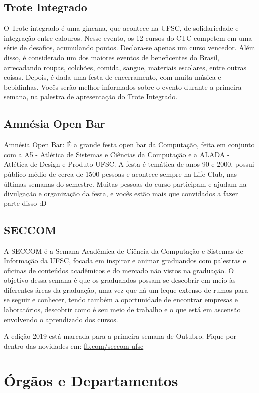 \documentclass{article}
\begin{document}
\subsection{Trote Integrado}
O Trote integrado é uma gincana, que acontece na UFSC, de solidariedade e integração entre calouros. Nesse evento, os 12 cursos do CTC competem em uma série de desafios, acumulando pontos. Declara-se apenas um curso vencedor. Além disso, é considerado um dos maiores eventos de beneficentes do Brasil, arrecadando roupas, colchões, comida, sangue, materiais escolares, entre outras coisas. Depois, é dada uma festa de encerramento, com muita música e bebidinhas. Vocês serão melhor informados sobre o evento durante a primeira semana, na palestra de apresentação do Trote Integrado. 

\subsection{Amnésia Open Bar} 
Amnésia Open Bar: É a grande festa open bar da Computação, feita em conjunto com a A5 - Atlética de Sistemas e Ciências da Computação e a ALADA - Atlética de Design e Produto UFSC. A festa é temática de anos 90 e 2000, possui público médio de cerca de 1500 pessoas e acontece sempre na Life Club, nas últimas semanas do semestre. Muitas pessoas do curso participam e ajudam na divulgação e organização da festa, e vocês estão mais que convidados a fazer parte disso :D

\subsection{SECCOM} 
A SECCOM é a Semana Acadêmica de Ciência da Computação e Sistemas de Informação da UFSC, focada em inspirar e animar graduandos com palestras e oficinas de conteúdos acadêmicos e do mercado não vistos na graduação. O objetivo dessa semana é que os graduandos possam se descobrir em meio às diferentes áreas da graduação, uma vez que há um leque extenso de rumos para se seguir e conhecer, tendo também a oportunidade de encontrar empresas e laboratórios, descobrir como é seu meio de trabalho e o que está em ascensão envolvendo o aprendizado dos cursos.  

A edição 2019 está marcada para a primeira semana de Outubro. Fique por dentro das novidades em: \url{fb.com/seccom-ufsc}


\section {Órgãos e Departamentos}
\end{document}
